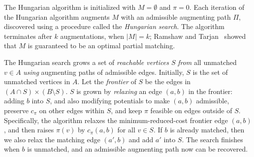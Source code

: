 \documentclass[a4paper,UKenglish]{socg-lipics-v2018}
\makeatletter
\def\abs#1{\mathopen| #1 \mathclose|}		%
\theoremstyle{plain}
\numberwithin{figure}{section}
\def\EMPH#1{\textcolor{BrickRed}{{\emph{#1}}}}
\def\n@te#1{\textsf{\boldmath \textbf{$\langle\!\langle$#1$\rangle\!\rangle$}}\leavevmode}
\def\note#1{\textcolor{red}{\n@te{#1}}}
\makeatother
\begin{document}
The Hungarian algorithm is initialized with $M = \emptyset$ and $\pi = 0$.
Each iteration of the Hungarian algorithm augments $M$ with an admissible
augmenting path $\Pi$, discovered using a procedure called the
\EMPH{Hungarian search}.
The algorithm terminates after $k$ augmentations, when $\abs{M} = k$;
Ramshaw and Tarjan~\cite{RT12} showed that $M$ is guaranteed to be an optimal partial matching.

The Hungarian search grows a set of \EMPH{reachable vertices $S$} \emph{from}
all unmatched $v \in A$ \emph{using} augmenting paths of admissible edges.
Initially, $S$ is the set of unmatched vertices in $A$.
Let the \EMPH{frontier} of $S$ be the edges in $(A \cap S) \times (B \setminus S)$.
$S$ is grown by \EMPH{relaxing} an edge $(a, b)$ in the frontier:
adding $b$ into $S$, and also modifying potentials to make $(a, b)$ admissible,
preserve $c_\pi$ on other edges within $S$, and keep $\pi$ feasible on edges outside of $S$.
Specifically, the algorithm relaxes the minimum-reduced-cost frontier edge $(a, b)$,
and then raises $\pi(v)$ by $c_\pi(a, b)$ for all $v \in S$.
%
If $b$ is already matched, then we also relax the matching edge $(a',b)$ and add $a'$ into $S$.
The search finishes when $b$ is unmatched, and an admissible augmenting path now can be recovered.
\end{document}
